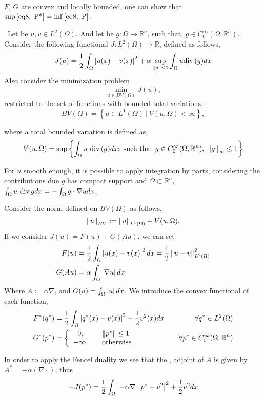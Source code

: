 $F$, $G$ are convex and locally bounded, one can show that 
$\sup\eqref{eq8. P*}=\inf\eqref{eq8. P}$.
\begin{example}
\	
Let be $u, v \in L^2(\Omega)$. And let be $g: \Omega\rightarrow \mathbb{R}^n$, such that, $g\in C_0^\infty(\Omega, \mathbb{R}^n)$. Consider the following functional $J: L^2(\Omega) \rightarrow \mathbb{R}$, defined as follows,
	\begin{equation*}
		J(u)=\frac{1}{2} \int_{\Omega}\left|u(x)-v(x)\right|^2+\alpha \sup_{\left\lVert g\right\rVert\leq 1} \int_{\Omega} u \mathrm{div\,} (g) dx
	\end{equation*}
	Also consider the minimization problem \[\min_{u\in BV(\Omega)} J(u),\] 
	restricted to the set of functions with bounded total variations,
	\[BV(\Omega)=\left\lbrace u\in L^1(\Omega) \ | \ V(u, \Omega) < \infty\right\rbrace,\]
	
	where a total bounded variation is defined as,
	\begin{equation*}
		V(u, \Omega)=\sup\left\lbrace 
		 \int_{\Omega} u\ \mathrm{div\,} (g) dx;  \ \text{such that} \ g \in C_0^\infty (\Omega, \mathbb{R}^n), \  \left\lVert g\right\rVert_\infty \leq 1
		\right\rbrace
	\end{equation*}

	 \begin{remark}
	 For $u$ smooth enough, it is possible to apply integration by parts, considering the contributions due $g$ has compact support and $\Omega\subset \mathbb{R}^n$, $\int_{\Omega} u\ \mathrm{div\,} g dx = -\int_{\Omega} g\cdot \nabla u  dx$.
	 \end{remark}

	Consider the norm defined on $BV(\Omega)$ as follows,	
		\[\left\lVert u\right\rVert_{BV}:= \left\lVert u\right\rVert_{L^1(\Omega)}+V(u, \Omega).\]
	If we consider $J(u)=F(u)+G(Au)$, we can set
	\begin{align*}
		F(u)&=\frac{1}{2}\int_{\Omega} \left|u(x)-v(x)\right|^2 dx = \frac{1}{2}\left\lVert u-v\right\rVert_{L^2(\Omega)}^2 \\
		G(Au)&=\alpha\int_{\Omega} \left|\nabla u\right|dx
	\end{align*}
	 Where $A:=\alpha \nabla$, and $G(u)=\int_{\Omega} \left|u\right|dx$. We introduce the convex functional of each function,
	\begin{align*}
		F^*(q^*)&=\frac{1}{2} \int_{\Omega}\left|q^*(x)-v(x)\right| ^2 -\frac{1}{2} v^2(x) dx & \quad \forall q^*\in L^2(\Omega)
\\
G^*(p^*) &={\left\lbrace 
	\begin{array}{cl}
		0, &\quad \left\lVert p^*\right\rVert \leq 1 \\
	-\infty, &\quad \text{otherwise}
	\end{array}
	\right.}  & \quad \forall p^* \in C_0^\infty(\Omega, \mathbb{R}^n)
	\end{align*}
	
	In order to apply the Fencel duality we see that the , adjoint of $A$ is given by $A^*=-\alpha (\nabla\cdot)$, thus	
	\[-J(p^*)=\frac{1}{2} \int_{\Omega} \left|-\alpha \nabla\cdot p^* + v^2\right|^2+ \frac{1}{2} v^2 dx\]
\end{example}

